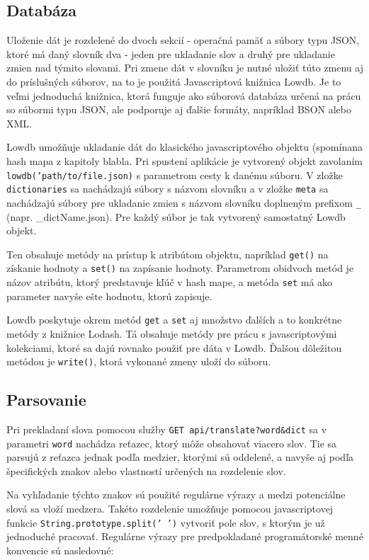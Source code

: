 \documentclass[
  digital, %
  table,   %
  lof,     %
  lot,     %
]{fithesis3}
\begin{document}
\subsection{Databáza}
Uloženie dát je rozdelené do dvoch sekcií - operačná pamäť a súbory typu JSON, ktoré má daný slovník dva - jeden pre ukladanie slov a druhý pre ukladanie zmien nad týmito slovami. Pri zmene dát v slovníku je nutné uložiť túto zmenu aj do príslušných súborov, na to je použitá Javascriptová knižnica Lowdb. Je to veľmi jednoduchá knižnica, ktorá funguje ako súborová databáza určená na prácu so súbormi typu JSON, ale podporuje aj ďalšie formáty, napríklad BSON alebo XML.

Lowdb umožňuje ukladanie dát do klasického javascriptového objektu (spomínana hash mapa z kapitoly blabla. Pri spustení aplikácie je vytvorený objekt zavolaním \texttt{lowdb('path/to/file.json)} s parametrom cesty k danému súboru. V zložke \texttt{dictionaries} sa nachádzajú súbory s názvom slovníku a v zložke \texttt{meta} sa nachádzajú súbory pre ukladanie zmien s názvom slovníku doplneným prefixom \texttt{\_} (napr. \_dictName.json). Pre každý súbor je tak vytvorený samostatný Lowdb objekt.

Ten obsahuje metódy na prístup k atribútom objektu, napríklad \texttt{get()} na získanie hodnoty a \texttt{set()} na zapísanie hodnoty. Parametrom obidvoch metód je názov atribútu, ktorý predstavuje kľúč v hash mape, a metóda \texttt{set} má ako parameter navyše ešte hodnotu, ktorú zapisuje.

Lowdb poskytuje okrem metód \texttt{get} a \texttt{set} aj množstvo ďalších a to konkrétne metódy z knižnice Lodash. Tá obsahuje metódy pre prácu s javascriptovými kolekciami, ktoré sa dajú rovnako použiť pre dáta v Lowdb. Ďalšou dôležitou metódou je \texttt{write()}, ktorá vykonané zmeny uloží do súboru.

\subsection{Parsovanie}
Pri prekladaní slova pomocou služby \texttt{GET api/translate?word\&dict} sa v parametri \texttt{word} nachádza reťazec, ktorý môže obsahovať viacero slov. Tie sa parsujú z reťazca jednak podľa medzier, ktorými sú oddelené, a navyše aj podľa špecifických znakov alebo vlastností určených na rozdelenie slov.

Na vyhľadanie týchto znakov sú použité regulárne výrazy a medzi potenciálne slová sa vloží medzera. Takéto rozdelenie umožňuje pomocou javascriptovej funkcie \texttt{String.prototype.split(' ')} vytvoriť pole slov, s ktorým je už jednoduché pracovať. Regulárne výrazy pre predpokladané programátorské menné konvencie sú nasledovné:
\\
\end{document}
